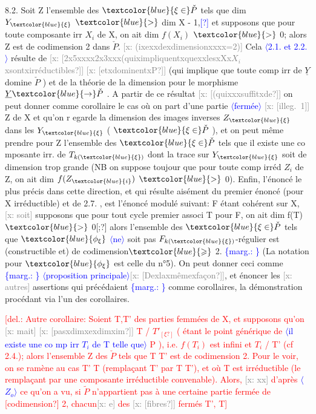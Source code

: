 \documentclass[11pt]{article}
\newcommand{\scanpage}[1]{\par\bigskip\noindent{\small\sffamily[scan #1]}\par}
\newcommand{\mspage}[1]{{\small\sffamily[p.\,#1]}}
\newcommand{\hand}[1]{\textcolor{blue}{#1}}
\newcommand{\inserted}[2][]{\textcolor{blue}{$\langle$#2$\rangle$}}
\newcommand{\margin}[1]{\textcolor{blue}{\{\textsf{marg.:} #1\}}}
\newcommand{\deleted}[1]{\textcolor{red}{[\textsf{del.:} #1]}}
\newcommand{\xout}[1]{\textcolor{gray}{[\textsf{x:} #1]}}
\newcommand{\unsure}[1]{[#1?]}
\newcommand{\illegible}[1]{[\textsf{illeg.\ #1}]}
\begin{document}
\clearpage
\scanpage{25/32}
\mspage{28}

8.2. Soit Z l'ensemble des $\hand{\xi\in}\check{P}$ tels que dim $Y_{\hand{\xi}}$ $\hand{>}$ dim X - 1,\hand{\unsure{\xi}}
et supposons que pour toute composante irr $X_i$ de X, on ait dim $f(X_i)$ $\hand{>}$ 0;
alors Z est de codimension 2 dans $\check{P}$. \xout{(ixexxdexdimensionxxxx=2)} Cela
\inserted[typed]{2.1. et 2.2.}
résulte de \xout{\unsure{2x5xxxx2x3xxx(quiximpliquentxquexxlesxXx$X_i$xsontxirréductibles}}
\xout{\unsure{etxdominentxP}} (qui implique que toute comp irr de $\underline{Y}$ domine $\check{P}$ ) et de
la théorie de la dimension pour le morphisme $\underline{Y} \hand{\to} \check{P}$ . A partir de ce
résultat \xout{\unsure{(quixxxsuffitxde}} on peut donner comme corollaire le cas où on
part d'une partie \inserted[typed]{fermée} \xout{\illegible{1}} Z de X et qu'on r egarde la dimension des
images inverses $Z_{\hand{\xi}}$ dans les $Y_{\hand{\xi}}$ ( $\hand{\xi\in}\check{P}$ ), et on peut même prendre pour
Z l'ensemble des $\hand{\xi\in}\check{P}$ tels que il existe une co mposante irr. de $T_{k(\hand{\xi})}$
dont la trace sur $Y_{\hand{\xi}}$ soit de dimension trop grande (NB on suppose toujour
que pour toute comp irréd $Z_i$ de Z, on ait dim $f(Z_{\hand{i}})$ $\hand{>}$ 0). Enfin, l'énoncé
le plus précis dans cette direction, et qui résulte aisément du premier
énoncé (pour X irréductible) et de 2.7. , est l'énoncé modulé suivant:
F étant cohérent sur X, \xout{soit} supposons que pour tout cycle premier associ
T pour F, on ait dim f(T)$\hand{>}$ 0\unsure{;} alors l'ensemble des $\hand{\xi\in}\check{P}$ tels que
$\hand{\phi_\xi}$ \inserted{ne} soit pas $F_{k(\hand{\xi})}$-régulier est (constructible et) de codimension$\hand{\geqslant}$ 2.
\margin{\textbar} (La notation pour $\hand{\phi_\xi}$ est celle du n°5). On peut donner ceci comme
\margin{\textbar} \inserted[typed]{proposition principale}\xout{\unsure{Dexlaxmêmexfaçon}}, et énoncer les \xout{autres} assertions qui précédaient
\margin{\textbar} comme corollaires, la démonstration procédant via l'un des corollaires.

\deleted{Autre corollaire: Soient T,T' des parties femmées de X, et supposons
qu'on \xout{mait} \xout{\unsure{pasxdimxexdimxim}} T / $T'_{\unsure{\xi}}$ ( étant le point générique de
\inserted[typed]{il existe une co mp irr $T_i$ de T telle que}
P ), i.e. $f(T_i)$ est infini et $T_i$ / T' (cf 2.4.); alors l'ensemble Z des
$\check{P}$ tels que T T' est de codimension 2. Pour le voir, on se
ramène au cas T' T (remplaçant T' par T T'), et où T est irréductible
(le remplaçant par une composante irréductible convenable). Alors, \xout{xx}
d'après \inserted[typed]{$Z_o$} ce qu'on a vu, si $\tilde{P}$ n'appartient pas à une certaine partie
fermée de \unsure{codimension} 2, chacun\xout{e} des \xout{\unsure{fibres}} fermés T', T}
\end{document}

